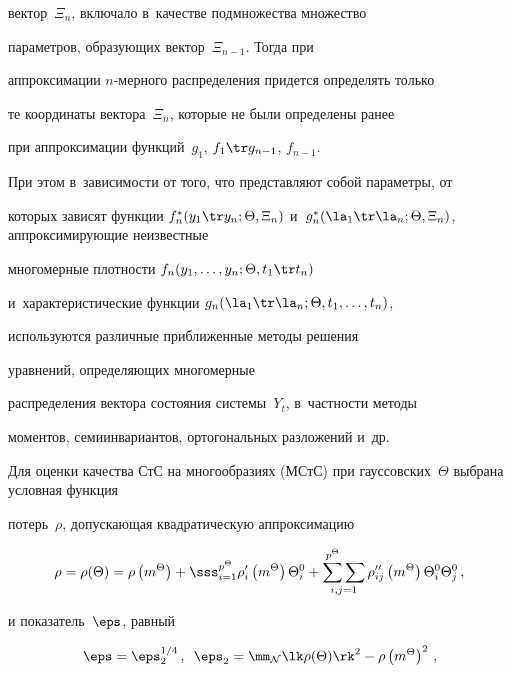 вектор~$\Xi_n$, включало в~качестве подмножества множество

па\-ра\-мет\-ров, образующих вектор~$\Xi_{n-1}$. Тогда при

аппроксимации $n$-мер\-но\-го распределения придется определять только

те координаты вектора~$\Xi_n$, которые не были определены ранее

при аппроксимации функций~$g_1$, $f_1\tr g_{n-1}$, $f_{n-1}$.



При этом в~зависимости от того, что представляют собой параметры, от

которых зависят функции $f_n^* (y_1\tr y_n;\Theta,\Xi_n)$ и~$g_n^*

(\la_1\tr \la_n;\Theta,\Xi_n)$, аппроксимирующие неизвестные

многомерные плотности $f_n (y_1,  \ldots,y_n;\Theta, t_1 \tr t_n)$ 

и~характеристические функции $g_n (\la_1\tr \la_n;\Theta, t_1,\ldots,t_n)$,

используются различные приближенные методы решения

уравнений, определяющих многомерные

распределения вектора состояния системы~$Y_t$, в~частности методы

моментов, семиинвариантов, ортогональных разложений и~др.



Для оценки качества СтС на многообразиях (МСтС) при гауссовских~$\Theta$ выбрана условная функция 

потерь~$\rho$, допускающая квадратическую аппроксимацию~\cite{9-s2, 10-s2}

    \begin{equation*}

    \rho = \rho(\Theta) = \rho \left(m^\Theta\right) + 

    \sss_{i=1}^{p^\Theta} \rho_i' \left(m^\Theta\right) \Theta_i^0 + 

    \ss2_{i, j =1} \rho_{ij}'' \left(m^\Theta \right)\Theta_i^0\Theta_j^0\,,


     \end{equation*}

и показатель~$\eps$, равный

    \begin{equation*}

    \eps = \eps_2^{1/4}\,,\enskip 

    \eps_2 =\mm_{\cal N} \lk \rho (\Theta)\rk^2 - \rho \left(m^\Theta\right)^2\,,


    \end{equation*}

